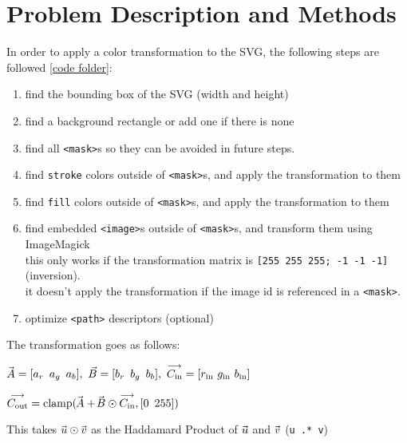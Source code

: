 \documentclass[12pt]{article}
\newcommand \hpx [1]{\hspace{#1px}}
\newcommand \nhpx [1]{\hspace{-#1px}}
\newcommand \Avec {\!\nhpx{-0.5}\vec{\hpx{0.5}A}}
\newcommand \Bvec {\nhpx{1.5}\vec{\hpx{0.3}B}}
\newcommand \uvec {\nhpx 1 \vec{\hpx 1 u}}
\newcommand \vvec {\nhpx 1 \vec{\hpx 1 v}}
\begin{document}
\section{Problem Description and Methods}

In order to apply a color transformation to the SVG, the following steps are followed
\ref{code folder}:
\begin{enumerate}
	\item \vspace{-0.5em} find the bounding box of the SVG (width and height)
	\item \vspace{-0.5em} find a background rectangle or add one if there is none
	\item \vspace{-0.5em} find all \texttt{<mask>}s so they can be avoided in
		future steps.
	\item \vspace{-0.5em} find {\tt stroke} colors outside of {\tt <mask>}s,
		and apply the transformation to them
	\item \vspace{-0.5em} find {\tt fill} colors outside of {\tt <mask>}s,
		and apply the transformation to them
	\item \vspace{-0.5em} find embedded {\tt <image>}s outside of {\tt <mask>}s,
		and transform them using ImageMagick\\
		this only works if the transformation matrix is {\tt [255 255 255; -1 -1 -1]}
		(inversion).\\
		it doesn't apply the transformation if the image id is referenced in a
		{\tt <mask>}.
	\item \vspace{-0.5em} optimize {\tt <path>} descriptors (optional)
\end{enumerate}

\pagebreak\restoregeometry

\noindent The transformation goes as follows:

$\Avec = [a_r ~\, a_g ~\, a_b],~\vec B = [b_r ~\, b_g ~\, b_b],~\overset{
\text{\raisebox{-0.5px}{$\longrightarrow$}}}{C_{\text{in}}} = [r_{\text{in}}
~ g_{\text{in}} ~ b_{\text{in}}]$

$\overset{\text{\raisebox{-0.5px}{$\longrightarrow$}}}{C_{\text{out}}} =
\text{clamp}(\Avec + \Bvec \odot
\overset{\text{\raisebox{-0.5px}{$\longrightarrow$}}}{C_{\text{in}}}, [0 ~\, 255])$

\noindent This takes $\uvec \odot \vvec$ as the Haddamard Product of $\uvec$ and
$\vvec$ (\texttt{\textcolor{variable}u \textcolor{operator}{.*} \textcolor{variable}v})
\vspace{5px}
\end{document}
